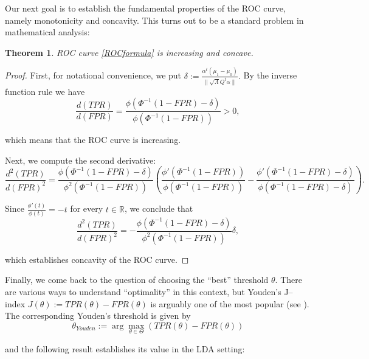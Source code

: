 \documentclass[10pt]{article}
\newtheorem{thm}{Theorem}
\newcommand{\reals}{\mathbb{R}}
\begin{document}
Our next goal is to establish the fundamental properties of the ROC curve, namely monotonicity and concavity. This turns out to be a standard problem in mathematical analysis:

\begin{thm}
ROC curve \eqref{ROCformula} is increasing and concave.
\end{thm}
\begin{proof}
First, for notational convenience, we put $\delta := \frac{\alpha^t(\mu_1 -\mu_0)}{\|\sqrt{\Lambda}Q^t\alpha\|}.$ By the inverse function rule we have 
$$\frac{d(TPR)}{d(FPR)} = \frac{\phi(\Phi^{-1}(1-FPR) - \delta)}{\phi(\Phi^{-1}(1-FPR))} > 0,$$

\noindent
which means that the ROC curve is increasing. 

Next, we compute the second derivative:  
$$\frac{d^2(TPR)}{d(FPR)^2} = \frac{\phi(\Phi^{-1}(1-FPR) - \delta)}{\phi^2(\Phi^{-1}(1-FPR))} \left(\frac{\phi'(\Phi^{-1}(1-FPR))}{\phi(\Phi^{-1}(1-FPR))} - \frac{\phi'(\Phi^{-1}(1-FPR) - \delta)}{\phi(\Phi^{-1}(1-FPR) - \delta)}\right).$$

\noindent
Since $\frac{\phi'(t)}{\phi(t)} = -t$ for every $t\in\reals$, we conclude that 
$$\frac{d^2(TPR)}{d(FPR)^2} = -\frac{\phi(\Phi^{-1}(1-FPR) - \delta)}{\phi^2(\Phi^{-1}(1-FPR))}\delta,$$

\noindent
which establishes concavity of the ROC curve.
\end{proof}

Finally, we come back to the question of choosing the ``best'' threshold $\theta.$ There are various ways to understand ``optimality'' in this context, but Youden's J--index $J(\theta) := TPR(\theta) - FPR(\theta)$ is arguably one of the most popular (see \cite{Youden}). The corresponding Youden's threshold is given by
$$\theta_{Youden} := \arg \max_{\theta\in\Theta} (TPR(\theta) - FPR(\theta))$$

\noindent
and the following result establishes its value in the LDA setting:
\end{document}
